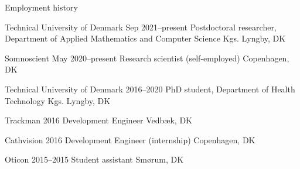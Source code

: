 
\begin{rSection}{Employment history}
    
    \begin{rSubsectionNoList} %
        {Technical University of Denmark} %
        {Sep 2021--present} %
        {Postdoctoral researcher, Department of Applied Mathematics and Computer Science} %
        {Kgs. Lyngby, DK}
    \end{rSubsectionNoList}
    
    
    \begin{rSubsectionNoList}
        {Somnoscient} %
        {May 2020--present} %
        {Research scientist (self-employed)} %
        {Copenhagen, DK}
    \end{rSubsectionNoList}
    
    
    \begin{rSubsectionNoList}
        {Technical University of Denmark} %
        {2016--2020} %
        {PhD student, Department of Health Technology} %
        {Kgs. Lyngby, DK}
    \end{rSubsectionNoList}
    
    
    \begin{rSubsectionNoList}
        {Trackman} %
        {2016} %
        {Development Engineer} %
        {Vedbæk, DK}
    \end{rSubsectionNoList}
    
    
    \begin{rSubsectionNoList}
        {Cathvision} %
        {2016} %
        {Development Engineer (internship)} %
        {Copenhagen, DK}
    \end{rSubsectionNoList}
    
    
    \begin{rSubsectionNoList}
        {Oticon} %
        {2015--2015} %
        {Student assistant} %
        {Smørum, DK}
    \end{rSubsectionNoList}
    

\end{rSection}
